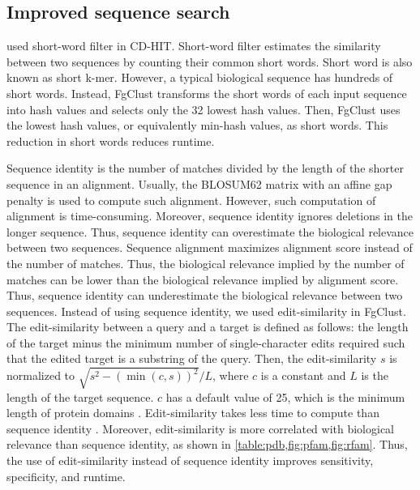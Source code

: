 \documentclass[11pt,letterpaper]{article}
\begin{document}
\subsection{Improved sequence search}
\label{subsec:seqsearch}

 used short-word filter in CD-HIT.
Short-word filter estimates the similarity between two sequences by counting their common short words.
Short word is also known as short k-mer.
However, a typical biological sequence has hundreds of short words.
Instead, FgClust transforms the short words of each input sequence into hash values and selects only the 32 lowest hash values.
Then, FgClust uses the lowest hash values, or equivalently min-hash values, as short words.
This reduction in short words reduces runtime.
\label{para:min-hash}

Sequence identity is the number of matches divided by the length of the shorter sequence in an alignment.
Usually, the BLOSUM62 matrix with an affine gap penalty is used to compute such alignment.
However, such computation of alignment is time-consuming.
Moreover, sequence identity ignores deletions in the longer sequence.
Thus, sequence identity can overestimate the biological relevance between two sequences.
Sequence alignment maximizes alignment score instead of the number of matches.
Thus, the biological relevance implied by the number of matches can be lower than the biological relevance implied by alignment score.
Thus, sequence identity can underestimate the biological relevance between two sequences.
Instead of using sequence identity, we used edit-similarity in FgClust.
The edit-similarity between a query and a target is defined as follows: 
	the length of the target minus the minimum number of single-character edits required such that the edited target is a substring of the query.
Then, the edit-similarity \(s\) is normalized to \(\sqrt{ s^2-(\min(c,s))^2}/L\), where \(c\) is a constant and \(L\) is the length of the target sequence.
\(c\) has a default value of 25, which is the minimum length of protein domains \citep[page 8]{niazi2016biosimilars}.
Edit-similarity takes less time to compute than sequence identity \citep{vsovsic2017edlib}.
Moreover, edit-similarity is more correlated with biological relevance than sequence identity, as shown in \cref{table:pdb,fig:pfam,fig:rfam}.
Thus, the use of edit-similarity instead of sequence identity improves sensitivity, specificity, and runtime.
\label{para:edsim}
\end{document}
